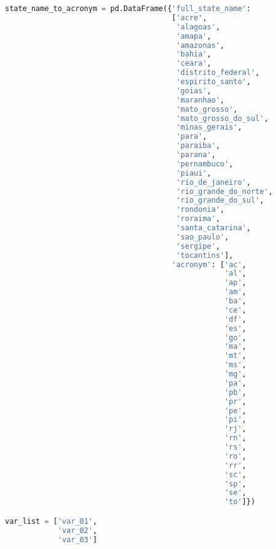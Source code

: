 \begin{lstlisting}[language=Python]
state_name_to_acronym = pd.DataFrame({'full_state_name': 
                                      ['acre', 
                                       'alagoas', 
                                       'amapa', 
                                       'amazonas', 
                                       'bahia', 
                                       'ceara', 
                                       'distrito_federal', 
                                       'espirito_santo', 
                                       'goias', 
                                       'maranhao', 
                                       'mato_grosso', 
                                       'mato_grosso_do_sul', 
                                       'minas_gerais', 
                                       'para', 
                                       'paraiba', 
                                       'parana', 
                                       'pernambuco', 
                                       'piaui', 
                                       'rio_de_janeiro', 
                                       'rio_grande_do_norte', 
                                       'rio_grande_do_sul', 
                                       'rondonia', 
                                       'roraima', 
                                       'santa_catarina', 
                                       'sao_paulo', 
                                       'sergipe', 
                                       'tocantins'],
                                      'acronym': ['ac',
                                                  'al',
                                                  'ap',
                                                  'am',
                                                  'ba',
                                                  'ce',
                                                  'df',
                                                  'es',
                                                  'go',
                                                  'ma',
                                                  'mt',
                                                  'ms',
                                                  'mg',
                                                  'pa',
                                                  'pb',
                                                  'pr',
                                                  'pe',
                                                  'pi',
                                                  'rj',
                                                  'rn',
                                                  'rs',
                                                  'ro',
                                                  'rr',
                                                  'sc',
                                                  'sp',
                                                  'se',
                                                  'to']})

var_list = ['var_01',
            'var_02',
            'var_03']
\end{lstlisting}

